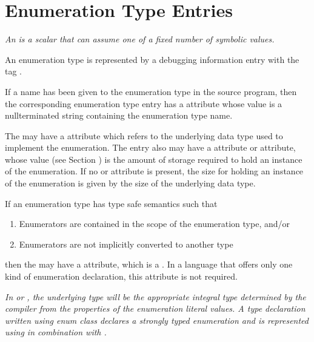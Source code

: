 \section{Enumeration Type Entries}
\label{chap:enumerationtypeentries}

\textit{An  is a scalar that can assume one of
a fixed number of symbolic values.}

An enumeration type is represented by a debugging information
entry with the tag
\DWTAGenumerationtypeTARG.

If a name has been given to the enumeration type in the source
program, then the corresponding enumeration type entry has
a \DWATname{} attribute
whose value is a null\dash terminated
string containing the enumeration type name.

The 
may have
a \DWATtype{} attribute
which refers to the underlying data type used to implement
the enumeration. The entry also may have a
\DWATbytesize{} attribute or
\DWATbitsize{}
attribute, whose value
(see Section )
is the amount of storage
required to hold an instance of the enumeration. If no
\DWATbytesize{} or \DWATbitsize{}
attribute is present, the size for holding an instance of the
enumeration is given by the size of the underlying data type.

If an enumeration type has type safe
semantics such that

\begin{enumerate}[1. ]
\item Enumerators are contained in the scope of the enumeration type, and/or

\item Enumerators are not implicitly converted to another type
\end{enumerate}

then the  may
have a \DWATenumclassDEFN{}
attribute, which is a .
In a language that offers only
one kind of enumeration declaration, this attribute is not
required.

\textit{In  or ,
the underlying type will be the appropriate
integral type determined by the compiler from the properties
of\hypertarget{chap:DWATenumclasstypesafeenumerationdefinition}{}
the enumeration literal values.
A  type declaration written
using enum class declares a strongly typed enumeration and
is represented using \DWTAGenumerationtype{}
in combination with \DWATenumclass.}

